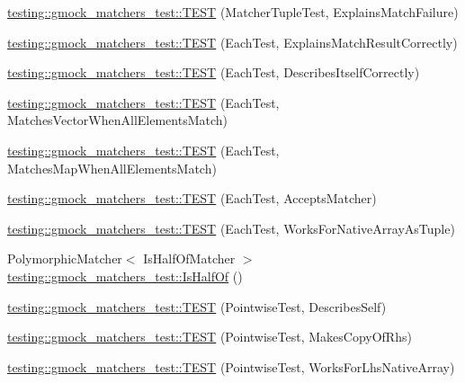 \begin{DoxyCompactItemize}
\item 
\hyperlink{namespacetesting_1_1gmock__matchers__test_abc9816afa3c83fc92e2c6ecfb2dd8e63}{testing\+::gmock\+\_\+matchers\+\_\+test\+::\+T\+E\+ST} (Matcher\+Tuple\+Test, Explains\+Match\+Failure)
\item 
\hyperlink{namespacetesting_1_1gmock__matchers__test_adf46df588332aa839b52af952fface1a}{testing\+::gmock\+\_\+matchers\+\_\+test\+::\+T\+E\+ST} (Each\+Test, Explains\+Match\+Result\+Correctly)
\item 
\hyperlink{namespacetesting_1_1gmock__matchers__test_a183c4b7acec060c6fe3dee650bc97e6d}{testing\+::gmock\+\_\+matchers\+\_\+test\+::\+T\+E\+ST} (Each\+Test, Describes\+Itself\+Correctly)
\item 
\hyperlink{namespacetesting_1_1gmock__matchers__test_a1310e7e85bf8ea8f2281850167e15465}{testing\+::gmock\+\_\+matchers\+\_\+test\+::\+T\+E\+ST} (Each\+Test, Matches\+Vector\+When\+All\+Elements\+Match)
\item 
\hyperlink{namespacetesting_1_1gmock__matchers__test_a53e7c1a04b8f178af52eeaa9f190cb64}{testing\+::gmock\+\_\+matchers\+\_\+test\+::\+T\+E\+ST} (Each\+Test, Matches\+Map\+When\+All\+Elements\+Match)
\item 
\hyperlink{namespacetesting_1_1gmock__matchers__test_a74f7c802ddb6879d3c76ff08d3e242b9}{testing\+::gmock\+\_\+matchers\+\_\+test\+::\+T\+E\+ST} (Each\+Test, Accepts\+Matcher)
\item 
\hyperlink{namespacetesting_1_1gmock__matchers__test_aef6eeafb03f698d16206836bbb6f05b9}{testing\+::gmock\+\_\+matchers\+\_\+test\+::\+T\+E\+ST} (Each\+Test, Works\+For\+Native\+Array\+As\+Tuple)
\item 
Polymorphic\+Matcher$<$ Is\+Half\+Of\+Matcher $>$ \hyperlink{namespacetesting_1_1gmock__matchers__test_ace0a8f64b108c7a9c32c2cac15185461}{testing\+::gmock\+\_\+matchers\+\_\+test\+::\+Is\+Half\+Of} ()
\item 
\hyperlink{namespacetesting_1_1gmock__matchers__test_a2c4c39058405e13e6c6b7fcf8e6bfe43}{testing\+::gmock\+\_\+matchers\+\_\+test\+::\+T\+E\+ST} (Pointwise\+Test, Describes\+Self)
\item 
\hyperlink{namespacetesting_1_1gmock__matchers__test_a9be60ebc74e280d7eb6668bfa316a765}{testing\+::gmock\+\_\+matchers\+\_\+test\+::\+T\+E\+ST} (Pointwise\+Test, Makes\+Copy\+Of\+Rhs)
\item 
\hyperlink{namespacetesting_1_1gmock__matchers__test_ad0e797104a482eba2d6c137cf9b676a5}{testing\+::gmock\+\_\+matchers\+\_\+test\+::\+T\+E\+ST} (Pointwise\+Test, Works\+For\+Lhs\+Native\+Array)

\end{DoxyCompactItemize}
